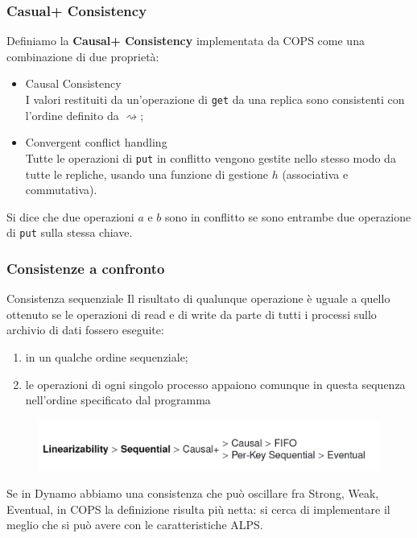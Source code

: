\begin{frame}
\frametitle{Casual+ Consistency}
\begin{definizione}
Definiamo la \textbf{Causal+ Consistency} implementata da COPS come una combinazione di due proprietà:
	\begin{itemize}
		\item<1-> Causal Consistency \\
				  I valori restituiti da un'operazione di \texttt{get} da una replica sono 
				  consistenti con l'ordine definito da $\rightsquigarrow$;
		\item<1-> Convergent conflict handling \\
				  Tutte le operazioni di \texttt{put} in conflitto vengono gestite nello
				  stesso modo da tutte le repliche, usando una funzione di gestione $h$ (associativa
				  e commutativa).
	\end{itemize}
\end{definizione}

\begin{definizione}
Si dice che due operazioni $a$ e $b$ sono in conflitto se sono entrambe
due operazione di \texttt{put} sulla stessa chiave.
\end{definizione}
\end{frame}

\begin{frame}
\frametitle{Consistenze a confronto}
\begin{block}{Consistenza sequenziale}
Il risultato di qualunque operazione è uguale a quello ottenuto se le operazioni
di read e di write da parte di tutti i processi sullo archivio di dati fossero eseguite:
	\begin{enumerate}
		\item in un qualche ordine sequenziale;
		\item le operazioni di ogni singolo processo appaiono comunque in questa sequenza
			  nell'ordine specificato dal programma
	\end{enumerate}
\end{block}	
	\begin{figure}
		\centering
		\includegraphics[scale=0.35]{COPS/COPS6.png}
	\end{figure}

Se in Dynamo abbiamo una consistenza che può oscillare fra Strong, Weak, Eventual,
in COPS la definizione risulta più netta: si cerca di implementare il meglio che si può
avere con le caratteristiche ALPS.
\end{frame}

